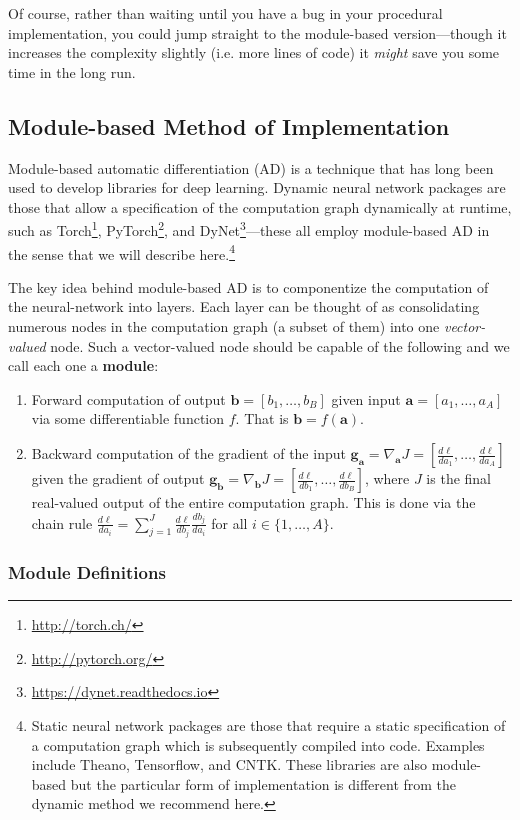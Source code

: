 \documentclass[11pt]{article}
\numberwithin{equation}{section} %
\numberwithin{figure}{section} %
\numberwithin{table}{section} %
\newcommand{\adj}[1]{\frac{d \ell}{d #1}}
\newcommand{\av}{\mathbf{a}}
\newcommand{\bv}{\mathbf{b}}
\newcommand{\gv}{\mathbf{g}}
\begin{document}
Of course, rather than waiting until you have a bug in your procedural implementation, you could jump straight to the module-based version---though it increases the complexity slightly (i.e. more lines of code) it \emph{might} save you some time in the long run.

\subsection{Module-based Method of Implementation}
\label{sec:modulebased}

Module-based automatic differentiation (AD) is a technique that has long been used to develop libraries for deep learning. Dynamic neural network packages are those that allow a specification of the computation graph dynamically at runtime, such as Torch\footnote{\url{http://torch.ch/}}, PyTorch\footnote{\url{http://pytorch.org/}}, and DyNet\footnote{\url{https://dynet.readthedocs.io}}---these all employ module-based AD in the sense that we will describe here.\footnote{Static neural network packages are those that require a static specification of a computation graph which is subsequently compiled into code. Examples include Theano, Tensorflow, and CNTK. These libraries are also module-based but the particular form of implementation is different from the dynamic method we recommend here.}

The key idea behind module-based AD is to componentize the computation of the neural-network into layers. Each layer can be thought of as consolidating numerous nodes in the computation graph (a subset of them) into one \emph{vector-valued} node. Such a vector-valued node should be capable of the following and we call each one a {\bf module}:
\begin{enumerate}
    \item Forward computation of output $\bv = [b_1, \ldots, b_B]$ given input $\av = [a_1, \ldots, a_A]$ via some differentiable function $f$. That is $\bv = f(\av)$. 
    \item Backward computation of the gradient of the input $\gv_{\av} = \nabla_{\av}J = [\adj{a_1}, \ldots, \adj{a_A}]$ given the gradient of output $\gv_{\bv} = \nabla_{\bv}J = [\adj{b_1}, \ldots, \adj{b_B}]$, where $J$ is the final real-valued output of the entire computation graph. This is done via the chain rule $\adj{a_i} = \sum_{j=1}^J \adj{b_j} \frac{d b_j}{d a_i}$ for all $i \in \{1, \ldots, A\}$.
\end{enumerate}

\subsubsection{Module Definitions}
\end{document}

